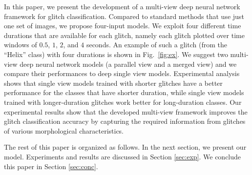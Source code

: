 \documentclass{article}
\begin{document}
In this paper, we present the development of a multi-view deep neural network framework for glitch classification. Compared to standard methods that use just one set of images, we propose  four-input models.
We exploit four different time durations that are available for each glitch, namely each glitch plotted over time windows of $0.5$, $1$, $2$, and $4$ seconds. An example of such a glitch (from the ``Helix'' class) with four durations is shown in Fig.~\ref{fig:ex}. We suggest two multi-view deep neural network models (a parallel view and a merged view) and we compare their performances to deep single view models. Experimental analysis shows that single view models trained with shorter glitches have a better performance for the classes that have shorter duration, while single view models trained with longer-duration glitches work better for long-duration classes.
Our experimental results show that the developed multi-view framework improves the glitch classification accuracy by capturing the required information from glitches of various morphological characteristics.

The rest of this paper is organized as follows. In the next section, we present our model. Experiments and results are discussed in Section \ref{sec:exp}. We conclude this paper in Section \ref{sec:conc}.
\end{document}
